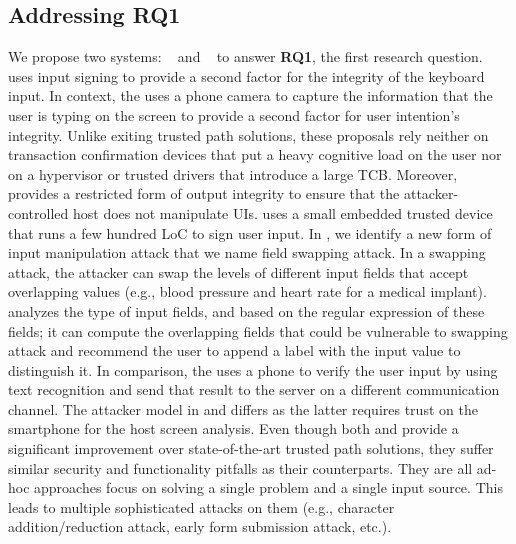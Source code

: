 \subsection{Addressing RQ1}
We propose two systems: \integrikey~\cite{integrikey} and \integriscreen~\cite{integriscreen} to answer \textbf{RQ1}, the first research question. \integrikey uses input signing to provide a second factor for the integrity of the keyboard input. In context, \integriscreen the uses a phone camera to capture the information that the user is typing on the screen to provide a second factor for user intention's integrity. Unlike exiting trusted path solutions, these proposals rely neither on transaction confirmation devices that put a heavy cognitive load on the user nor on a hypervisor or trusted drivers that introduce a large TCB. Moreover, \integriscreen provides a restricted form of output integrity to ensure that the attacker-controlled host does not manipulate UIs. \integrikey uses a small embedded trusted device that runs a few hundred LoC to sign user input. In \integrikey, we identify a new form of input manipulation attack that we name field swapping attack. In a swapping attack, the attacker can swap the levels of different input fields that accept overlapping values (e.g., blood pressure and heart rate for a medical implant). \integrikey analyzes the type of input fields, and based on the regular expression of these fields; it can compute the overlapping fields that could be vulnerable to swapping attack and recommend the user to append a label with the input value to distinguish it. 
In comparison, the \integriscreen uses a phone to verify the user input by using text recognition and send that result to the server on a different communication channel. The attacker model in \integrikey and \integriscreen differs as the latter requires trust on the smartphone for the host screen analysis. Even though both \integrikey and \integriscreen provide a significant improvement over state-of-the-art trusted path solutions, they suffer similar security and functionality pitfalls as their counterparts. They are all ad-hoc approaches focus on solving a single problem and a single input source. This leads to multiple sophisticated attacks on them (e.g., character addition/reduction attack, early form submission attack, etc.).


